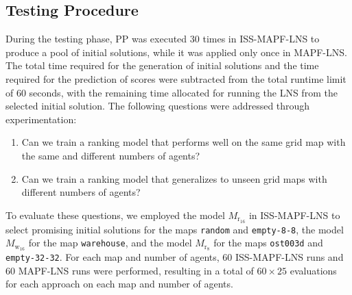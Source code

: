 \documentclass[runningheads]{llncs}
\begin{document}
\subsection{Testing Procedure}

During the testing phase, PP was executed 30 times in ISS-MAPF-LNS to produce a pool of initial solutions, while it was applied only once in MAPF-LNS. The total time required for the generation of initial solutions and the time required for the prediction of scores were subtracted from the total runtime limit of 60 seconds, with the remaining time allocated for running the LNS from the selected initial solution. The following questions were addressed through experimentation:

\begin{enumerate}
    \item Can we train a ranking model that performs well on the same grid map with the same and different numbers of agents?
    \item Can we train a ranking model that generalizes to unseen grid maps with different numbers of agents?
\end{enumerate}


To evaluate these questions, we employed the model $M_{\mathrm{r}_{16}}$ in ISS-MAPF-LNS to select promising initial solutions for the maps \texttt{random} and \texttt{empty-8-8}, the model $M_{\mathrm{w}_{16}}$ for the map \texttt{warehouse}, and the model $M_{\mathrm{r}_8}$ for the maps \texttt{ost003d} and \texttt{empty-32-32}. For each map and number of agents, 60 ISS-MAPF-LNS runs and 60 MAPF-LNS runs were performed, resulting in a total of $60 \times 25$ evaluations for each approach on each map and number of agents.
\end{document}
